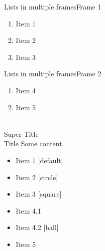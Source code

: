 \documentclass{beamer}
\begin{document}
\begin{frame}{Lists in multiple frames}{Frame 1}
  \begin{enumerate}
  \item Item 1
  \item Item 2
  \item Item 3
    \setcounter{currentenumi}{\theenumi}
  \end{enumerate}
\end{frame}
\begin{frame}{Lists in multiple frames}{Frame 2}
  \begin{enumerate}
    \setcounter{enumi}{\thecurrentenumi}
  \item Item 4
  \item Item 5
  \end{enumerate}
\end{frame}


\newcommand{\titlepair}[2]{{\\ [-4ex] {\scriptsize #1} \\ [-0.0ex] #2}}

\begin{frame}{\titlepair{Super Title}{Title}}
    Some content
\end{frame}


\begin{frame}
  \begin{itemize}
  \item Item 1
    [default]
  \item Item 2
    [circle]
  \item Item 3
    [square]
  \item Item 4.1
  \item Item 4.2
    [ball]
  \item Item 5
  \end{itemize}
\end{frame}

\end{document}
